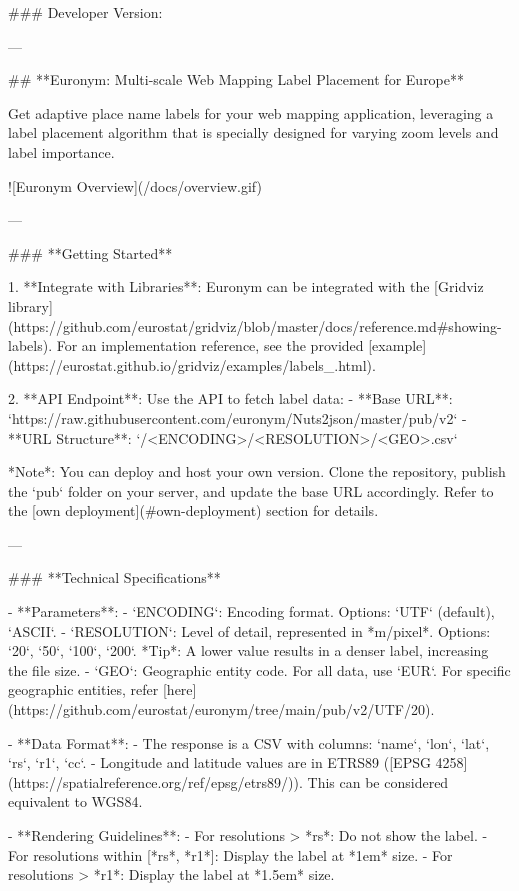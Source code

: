 ### Developer Version:

---

## **Euronym: Multi-scale Web Mapping Label Placement for Europe**

Get adaptive place name labels for your web mapping application, leveraging a label placement algorithm that is specially designed for varying zoom levels and label importance.

![Euronym Overview](/docs/overview.gif)

---

### **Getting Started**

1. **Integrate with Libraries**: Euronym can be integrated with the [Gridviz library](https://github.com/eurostat/gridviz/blob/master/docs/reference.md#showing-labels). For an implementation reference, see the provided [example](https://eurostat.github.io/gridviz/examples/labels_.html).

2. **API Endpoint**: Use the API to fetch label data:
    - **Base URL**: `https://raw.githubusercontent.com/euronym/Nuts2json/master/pub/v2`
    - **URL Structure**: `/<ENCODING>/<RESOLUTION>/<GEO>.csv`
    
    *Note*: You can deploy and host your own version. Clone the repository, publish the `pub` folder on your server, and update the base URL accordingly. Refer to the [own deployment](#own-deployment) section for details.

---

### **Technical Specifications**

- **Parameters**:
    - `ENCODING`: Encoding format. Options: `UTF` (default), `ASCII`.
    - `RESOLUTION`: Level of detail, represented in *m/pixel*. Options: `20`, `50`, `100`, `200`. *Tip*: A lower value results in a denser label, increasing the file size.
    - `GEO`: Geographic entity code. For all data, use `EUR`. For specific geographic entities, refer [here](https://github.com/eurostat/euronym/tree/main/pub/v2/UTF/20).

- **Data Format**:
    - The response is a CSV with columns: `name`, `lon`, `lat`, `rs`, `r1`, `cc`.
    - Longitude and latitude values are in ETRS89 ([EPSG 4258](https://spatialreference.org/ref/epsg/etrs89/)). This can be considered equivalent to WGS84.

- **Rendering Guidelines**:
    - For resolutions > *rs*: Do not show the label.
    - For resolutions within [*rs*, *r1*]: Display the label at *1em* size.
    - For resolutions > *r1*: Display the label at *1.5em* size.

